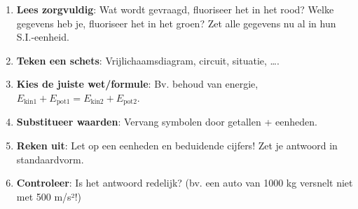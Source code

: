 \documentclass{ximera}
\begin{document}
\begin{example}
\begin{enumerate}
    \item \textbf{Lees zorgvuldig}: Wat wordt gevraagd, fluoriseer het in het rood? Welke gegevens heb je, fluoriseer het in het groen? Zet alle gegevens nu al in hun S.I.-eenheid.
    \item \textbf{Teken een schets}: Vrijlichaamsdiagram, circuit, situatie, \dots.
    \item \textbf{Kies de juiste wet/formule}: Bv. behoud van energie, \(E_\text{kin1}+E_\text{pot1} = E_\text{kin2}+E_\text{pot2}\).
    \item \textbf{Substitueer waarden}: Vervang symbolen door getallen + eenheden.
    \item \textbf{Reken uit}: Let op een eenheden en beduidende cijfers! Zet je antwoord in standaardvorm.
    \item \textbf{Controleer}: Is het antwoord redelijk? (bv. een auto van 1000 kg versnelt niet met 500 m/s²!)
\end{enumerate}
\end{example}


\end{document}

